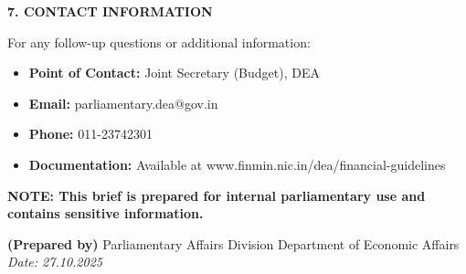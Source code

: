 \documentclass[12pt,a4paper]{article}
\newcommand{\sectionheader}[1]{\textbf{#1}}
\begin{document}
\vspace{0.5cm}

\sectionheader{7. CONTACT INFORMATION}

For any follow-up questions or additional information:
\begin{itemize}[leftmargin=*, itemsep=2pt]
    \item \textbf{Point of Contact:} Joint Secretary (Budget), DEA
    \item \textbf{Email:} parliamentary.dea@gov.in
    \item \textbf{Phone:} 011-23742301
    \item \textbf{Documentation:} Available at www.finmin.nic.in/dea/financial-guidelines
\end{itemize}

\vspace{1cm}

\begin{center}
    {\small \color{restrictedred} \textbf{NOTE: This brief is prepared for internal parliamentary use and contains sensitive information.}}
\end{center}

\vspace{0.3cm}

\begin{flushright}
    \textbf{(Prepared by)}
    Parliamentary Affairs Division
    Department of Economic Affairs
    \textit{Date: 27.10.2025}
\end{flushright}
\end{document}
